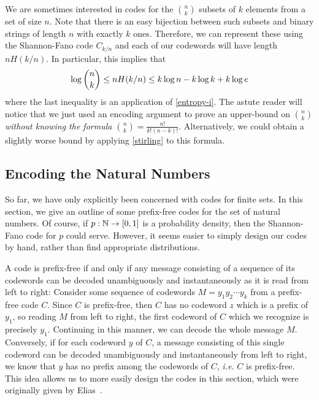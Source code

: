 \documentclass[prodmode,acmcsur]{acmsmall}
\begin{document}
We are sometimes interested in codes for the $\binom{n}{k}$ subsets of
$k$ elements from a set of size $n$. Note that there is an easy
bijection between such subsets and binary strings of length $n$ with
exactly $k$ ones. Therefore, we can represent these using the
Shannon-Fano code $C_{k/n}$ and each of our codewords will have length
$nH(k/n)$.  In particular, this implies that
\begin{equation}
  \log\binom{n}{k} \le nH(k/n) \le k\log n - k\log k + k\log e 
  \eqlabel{log-n-choose-k}
\end{equation}
where the last inequality is an application of \eqref{entropy-i}. The
astute reader will notice that we just used an encoding argument to
prove an upper-bound on $\binom{n}{k}$ \emph{without knowing the 
formula $\binom{n}{k}=\frac{n!}{k! (n - k)!}$}. Alternatively, we 
could obtain a slightly worse bound by applying 
\eqref{stirling} to this formula.

\subsection{Encoding the Natural Numbers}

So far, we have only explicitly been concerned with codes for finite
sets. In this section, we give an outline of some
prefix-free codes for the set of natural numbers. Of course, if $p :
\mathbb{N} \to [0, 1]$ is a probability density, then the Shannon-Fano code
for $p$ could serve. However, it seems easier to simply design our
codes by hand, rather than find appropriate distributions.

A code is prefix-free if and only if any message consisting of a
sequence of its codewords can be decoded unambiguously and
instantaneously as it is read from left to right: Consider some
sequence of codewords $M = y_1 y_2 \cdots y_k$ from a prefix-free code
$C$. Since $C$ is prefix-free, then $C$ has no codeword $z$ which is a
prefix of $y_1$, so reading $M$ from left to right, the first codeword
of $C$ which we recognize is precisely $y_1$. Continuing in this
manner, we can decode the whole message $M$. Conversely, if for each
codeword $y$ of $C$, a message consisting of this single codeword can
be decoded unambiguously and instantaneously from left to right, we
know that $y$ has no prefix among the codewords of $C$, \emph{i.e.}
$C$ is prefix-free. 
This idea allows us to more easily design
the codes in this section, which were originally given by
Elias~\cite{elias:coding}.
\end{document}
